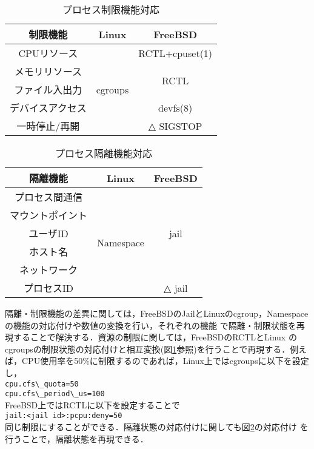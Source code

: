 \documentclass[11pt]{jarticle}
\begin{document}
\begin{table}[t]
\vspace{-1.0em}
  \caption{プロセス制限機能対応}
  \vspace{-1em}
  \label{tb:limit}
  \begin{center}
  \begin{tabular}{|c|c|c|} \hline
    制限機能 & Linux & FreeBSD \\ \hline \hline
    CPUリソース & \multirow{5}{*}{cgroups} &  RCTL+cpuset(1) \\ \cline{1-1} \cline{3-3}
    メモリリソース &  &  \multirow{2}{*}{RCTL} \\ \cline{1-1}
    ファイル入出力 &  &  \\ \cline{1-1} \cline{3-3}
    デバイスアクセス &  & devfs(8) \\ \cline{1-1} \cline{3-3}
    一時停止/再開 &  & △ SIGSTOP \\ \hline
  \end{tabular}
\end{center}
\end{table}
\begin{table}[t]
  \vspace{-1.0em}
  \caption{プロセス隔離機能対応}
  \label{tb:isolation}
  \begin{center}
  \begin{tabular}{|c|c|c|} \hline
    隔離機能 & Linux & FreeBSD \\ \hline \hline
    プロセス間通信 & \multirow{6}{*}{Namespace} &  \multirow{5}{*}{jail} \\ \cline{1-1}
    マウントポイント &  & \\ \cline{1-1}
    ユーザID &  &  \\ \cline{1-1}
    ホスト名 &  & \\ \cline{1-1}
    ネットワーク &  & \\ \cline{1-1} \cline{3-3}
    プロセスID &  & △ jail \\ \hline
  \end{tabular}
\end{center}
\end{table}
隔離・制限機能の差異に関しては，FreeBSDのJailとLinuxのcgroup，Namespaceの機能の対応付けや数値の変換を行い，それぞれの機能
で隔離・制限状態を再現することで解決する．資源の制限に関しては，FreeBSDのRCTLとLinux
のcgroupsの制限状態の対応付けと相互変換(図\ref{tb:limit}参照)を行うことで再現する．例え
ば，CPU使用率を50\%に制限するのであれば，Linux上ではcgroupsに以下を設定し，\\
\verb|cpu.cfs\_quota=50|\\
\verb|cpu.cfs\_period\_us=100|\\
FreeBSD上ではRCTLに以下を設定することで\\
\verb|jail:<jail id>:pcpu:deny=50|\\
同じ制限にすることができる．隔離状態の対応付けに関しても図\ref{tb:isolation}の対応付け
を行うことで，隔離状態を再現できる．
\end{document}
